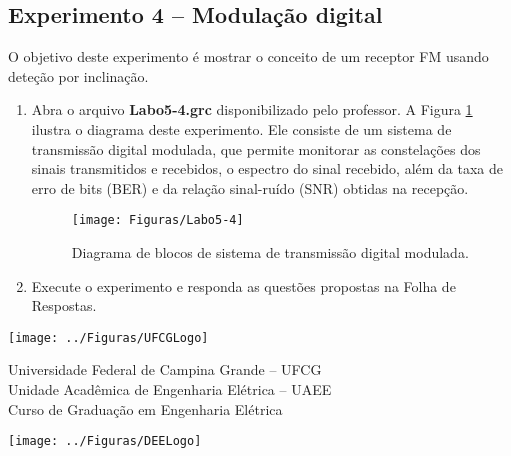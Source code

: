 \documentclass[12pt,addpoints]{exam}
\begin{document}

\subsection{Experimento 4 -- Modulação digital}

O objetivo deste experimento é mostrar o conceito de um receptor FM usando deteção por inclinação.

\begin{enumerate}
    \item  Abra o arquivo \textbf{Labo5-4.grc} disponibilizado pelo professor. A Figura \ref{fig:GRC_5-4} ilustra o diagrama deste experimento. Ele consiste de um sistema de transmissão digital modulada, que permite monitorar as constelações dos sinais transmitidos e recebidos, o espectro do sinal recebido, além da taxa de erro de bits (BER) e da relação sinal-ruído (SNR) obtidas na recepção.
    \begin{figure}[htb]
        \centering
        \texttt{[image: Figuras/Labo5-4]}
        \caption{Diagrama de blocos de sistema de transmissão digital modulada.} 
        \label{fig:GRC_5-4}
    \end{figure}
  \item Execute o experimento e responda as questões propostas na Folha de Respostas.
\end{enumerate}


\clearpage
\newpage {}

\noindent \texttt{[image: ../Figuras/UFCGLogo]} \hfill
\begin{minipage}{.66\textwidth} \large \centering \vspace{-1.8cm}
    Universidade Federal de Campina Grande -- UFCG \\
    Unidade Acadêmica de Engenharia Elétrica -- UAEE \\
    Curso de Graduação em Engenharia Elétrica
\end{minipage}
\hfill \texttt{[image: ../Figuras/DEELogo]} \\[12pt]
\end{document}
